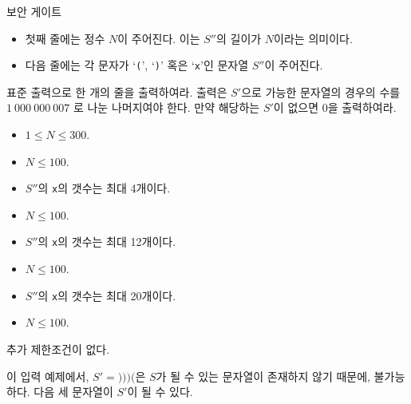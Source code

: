 \begin{problem}{보안 게이트}
	\begin{itemize}
		\item 첫째 줄에는 정수 $N$이 주어진다. 이는 $S''$의 길이가 $N$이라는 의미이다.
		\item 다음 줄에는 각 문자가 `\texttt{(}', `\texttt{)}' 혹은 `\texttt{x}'인 문자열 $S''$이 주어진다.
	\end{itemize}
	
	\OutputFile
	
	표준 출력으로 한 개의 줄을 출력하여라. 출력은 $S'$으로 가능한 문자열의 경우의 수를 $1\ 000\ 000\ 007$ 로 나눈 나머지여야 한다. 만약 해당하는 $S'$이 없으면 0을 출력하여라.
	
	\Constraints
	
	\begin{itemize}
		\item $1 \le N \le 300$.
	\end{itemize}
	
	
	\begin{itemize}
		\item $N \le 100$.
		\item $S''$의 \texttt{x}의 갯수는 최대 4개이다.
	\end{itemize}

\begin{itemize}
	\item $N \le 100$.
	\item $S''$의 \texttt{x}의 갯수는 최대 12개이다.
\end{itemize}

\begin{itemize}
	\item $N \le 100$.
	\item $S''$의 \texttt{x}의 갯수는 최대 20개이다.
\end{itemize}

\begin{itemize}
	\item $N \le 100$.
\end{itemize}


	
	추가 제한조건이 없다.
	
	\Examples
	
	\begin{example}
	\end{example}
	
	이 입력 예제에서, $S' = \texttt{)))(}$은 $S$가 될 수 있는 문자열이 존재하지 않기 때문에, 불가능하다.
	다음 세 문자열이 $S'$이 될 수 있다.
	

\end{problem}
